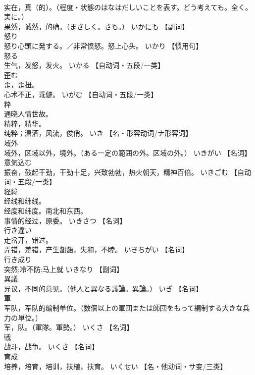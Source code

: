 \documentclass[8pt]{extreport}
\begin{document}
\begin{CJK}{UTF8}{min}
\\	实在，真（的）。（程度・状態のはなはだしいことを表す。どう考えても。全く。実に。） 
\\	果然，诚然，的确。（まさしく。さも。）	いかにも		【副词】
\\	怒り	
\\	怒り心頭に発する。／非常愤怒。怒上心头。	いかり		【惯用句】
\\	怒る	
\\	生气，发怒，发火。	いかる		【自动词・五段/一类】
\\	歪む	
\\	歪，歪扭。 
\\	心术不正，乖僻。	いがむ		【自动词・五段/一类】
\\	粋	
\\	通晓人情世故。 
\\	精粹，精华。 
\\	纯粹；潇洒，风流，俊俏。	いき		【名・形容动词/ナ形容词】
\\	域外	
\\	域外，区域以外，境外。（ある一定の範囲の外。区域の外。）	いきがい		【名词】
\\	意気込む	
\\	振奋，鼓起干劲，干劲十足，兴致勃勃，热火朝天，精神百倍。	いきごむ		【自动词・五段/一类】
\\	経緯	
\\	经线和纬线。 
\\	经度和纬度。南北和东西。 
\\	事情的经过，原委。	いきさつ		【名词】
\\	行き違い	
\\	走岔开，错过。 
\\	弄错，差错，产生龃龉，失和，不睦。	いきちがい		【名词】
\\	行き成り	
\\	突然;冷不防;马上就	いきなり		【副词】
\\	異議	
\\	异议，不同的意见。（他人と異なる議論。異論。）	いぎ		【名词】
\\	軍	
\\	军队，军队的编制单位。（数個以上の軍団または師団をもって編制する大きな兵力の単位。） 
\\	军，队。（軍隊。軍勢。）	いくさ		【名词】
\\	戦	
\\	战斗，战争。	いくさ		【名词】
\\	育成	
\\	培养，培育，培训，扶植，扶育。	いくせい		【名・他动词・サ变/三类】

\end{CJK}
\end{document}
